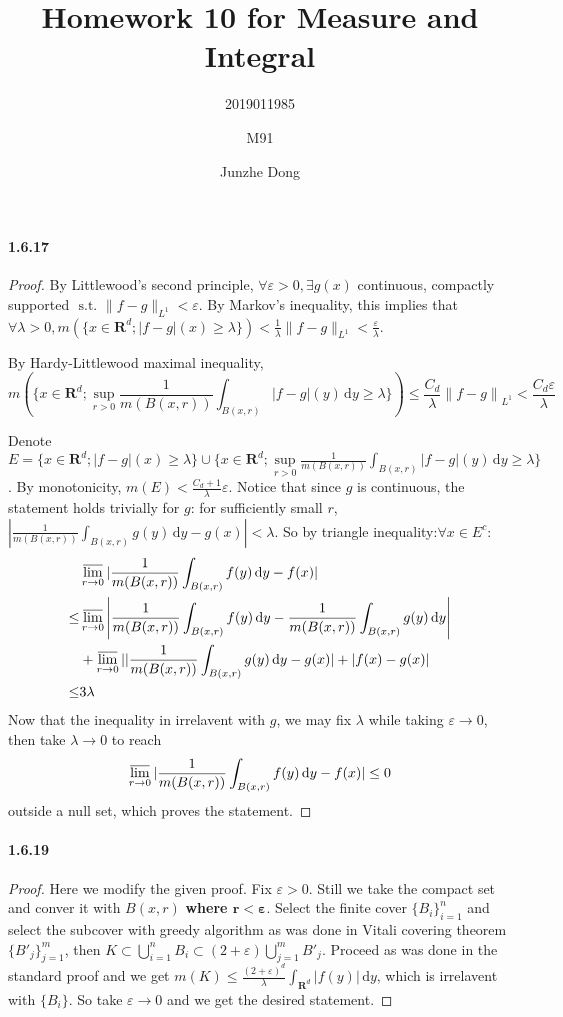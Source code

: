 \documentclass{article}
\title{Homework 10 for Measure and Integral}
\author{2019011985\and M91\and Junzhe Dong}
\begin{document}
\newcommand{\st}{\text{ s.t. }}
\newcommand{\R}{\mathbf{R}}
\newcommand{\dd}{\,\mathrm{d}}

\maketitle
\paragraph{1.6.17}
\begin{proof}
By Littlewood's second principle, $\forall \varepsilon>0,\exists g(x)$ continuous, compactly supported $\st \|f-g\|_{L^1}<\varepsilon$. By Markov's inequality, this implies that $\forall \lambda>0, m(\{x\in\R^d;|f-g|(x)\geq\lambda\})<\frac{1}{\lambda}\|f-g\|_{L^1}<\frac{\varepsilon}{\lambda}$.

By Hardy-Littlewood maximal inequality, \[m(\{x\in\R^d;\sup\limits_{r>0}\frac{1}{m(B(x,r))}\int_{B(x,r)}|f-g|(y)\dd y\geq\lambda\})\leq \frac{C_d}{\lambda}\left\|f-g\right\|_{L^1}<\frac{C_d\varepsilon}{\lambda}\]

Denote $E=\{x\in\R^d;|f-g|(x)\geq\lambda\}\cup\{x\in\R^d;\sup\limits_{r>0}\frac{1}{m(B(x,r))}\int_{B(x,r)}|f-g|(y)\dd y\geq\lambda\}$. By monotonicity, $m(E)<\frac{C_d+1}{\lambda}\varepsilon$. Notice that since $g$ is continuous, the statement holds trivially for $g$: for sufficiently small $r$, $|\frac{1}{m(B(x,r))}\int_{B(x,r)}g(y)\dd y-g(x)|<\lambda$. So by triangle inequality:$\forall x\in E^c:$
\[\begin{aligned}
&\varlimsup_{r\to 0}|\frac{1}{m(B(x,r))}\int_{B(x,r)}f(y)\dd y-f(x)|\\
\leq& \varlimsup_{r\to 0}\left|\frac{1}{m(B(x,r))}\int_{B(x,r)}f(y)\dd y- \frac{1}{m(B(x,r))}\int_{B(x,r)}g(y)\dd y\right|\\
&+\varlimsup_{r\to 0}||\frac{1}{m(B(x,r))}\int_{B(x,r)}g(y)\dd y-g(x)|+|f(x)-g(x)|\\
\leq &3\lambda
\end{aligned}\]
Now that the inequality in irrelavent with $g$, we may fix $\lambda$ while taking $\varepsilon\to 0$, then take $\lambda\to 0$ to reach
\[\varlimsup_{r\to 0}|\frac{1}{m(B(x,r))}\int_{B(x,r)}f(y)\dd y-f(x)|\leq 0\]
outside a null set, which proves the statement.
\end{proof}

\paragraph{1.6.19}
\begin{proof}
Here we modify the given proof. Fix $\varepsilon>0$. Still we take the compact set and conver it with $B(x,r)$ \textbf{where $\bm{r<\varepsilon}$}. Select the finite cover $\{B_i\}_{i=1}^n$ and select the subcover with greedy algorithm as was done in Vitali covering theorem $\{B'_j\}_{j=1}^m$, then $K\subset\bigcup\limits_{i=1}^n B_i\subset (2+\varepsilon)\bigcup\limits_{j=1}^m B'_j$. Proceed as was done in the standard proof and we get $m(K)\leq \frac{(2+\varepsilon)^d}{\lambda}\int_{\R^d}|f(y)|\dd y$, which is irrelavent with $\{B_i\}$. So take $\varepsilon\to 0$ and we get the desired  statement.
\end{proof}
\end{document}
